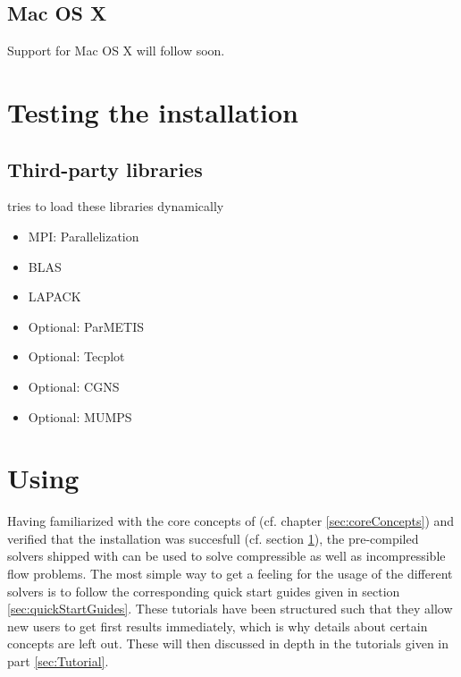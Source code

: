 \documentclass[a4paper,10pt]{report} %
\begin{document}
\subsection{Mac OS X}
Support for Mac OS X will follow soon.


\section{Testing the installation}
\label{sec:installation_testing}



\subsection{Third-party libraries}
\label{sec:installation_libraries}

\BoSSS{} tries to load these libraries dynamically
\begin{itemize}
	\item MPI: Parallelization
	\item BLAS
	\item LAPACK
	\item Optional: ParMETIS
	\item Optional: Tecplot
	\item Optional: CGNS
	\item Optional: MUMPS
\end{itemize}


\section{Using \BoSSS{}}
\label{sec:gettingStarted_using}

Having familiarized with the core concepts of \BoSSS{} (cf. chapter \ref{sec:coreConcepts}) and verified that the installation was succesfull (cf. section \ref{sec:installation_testing}), the pre-compiled solvers shipped with \BoSSS{} can be used to solve compressible as well as incompressible flow problems. The most simple way to get a feeling for the usage of the different solvers is to follow the corresponding quick start guides given in section \ref{sec:quickStartGuides}. These tutorials have been structured such that they allow new users to get first results immediately, which is why details about certain concepts are left out. These will then discussed in depth in the tutorials given in part \ref{sec:Tutorial}.
\end{document}

